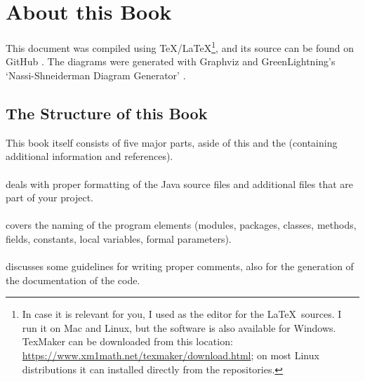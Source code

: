 \section{About this Book}
This document was compiled using \TeX/\LaTeX{}\footnote{In case it is relevant for you, I used  as the editor for the \LaTeX~sources. I run it on Mac and Linux, but the software is also available for Windows. TexMaker can be downloaded from this location: \url{https://www.xm1math.net/texmaker/download.html}; on most Linux distributions it can installed directly from the repositories.}, and its source can be found on GitHub \autocite{TQUADRAT_ORG_DOCUMENT_REPOSITORY}. The diagrams were generated with Graphviz \autocite{Graphviz} and GreenLightning's ‘Nassi-Shneiderman Diagram Generator’ \autocite{WIKIPEDIA:NSD, NSDG, NSDG:Download}.

\subsection{The Structure of this Book}
This book itself consists of five major parts, aside of this  and the  (containing additional information and references).

\paragraph{} deals with proper formatting of the Java source files and additional files that are part of your project.

\paragraph{} covers the naming of the program elements (modules, packages, classes, methods, fields, constants, local variables, formal parameters).

\paragraph{} discusses some guidelines for writing proper comments, also for the generation of the documentation of the code.

